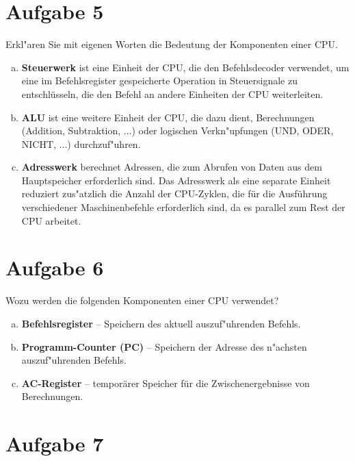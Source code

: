 \documentclass[10pt, a4paper, oneside]{article}
\begin{document}
\section{Aufgabe 5}

Erkl"aren Sie mit eigenen Worten die Bedeutung der Komponenten einer CPU.

\begin{enumerate}[(a)]
    \item \textbf{Steuerwerk} ist eine Einheit der CPU, die den Befehlsdecoder verwendet,
        um eine im Befehlsregister gespeicherte Operation in
        Steuersignale zu entschlüsseln, die den Befehl an andere Einheiten der
        CPU weiterleiten.

    \item \textbf{ALU} ist eine weitere Einheit der CPU, die dazu dient, Berechnungen
        (Addition, Subtraktion, ...) oder logischen Verkn"upfungen (UND, ODER,
        NICHT, ...) durchzuf"uhren.

    \item \textbf{Adresswerk} berechnet Adressen, die zum Abrufen von Daten aus dem
        Hauptspeicher erforderlich sind. Das Adresswerk als eine separate
        Einheit reduziert zus"atzlich die Anzahl der CPU-Zyklen, die für die
        Ausführung verschiedener Maschinenbefehle erforderlich sind, da es
        parallel zum Rest der CPU arbeitet.
\end{enumerate}

\section{Aufgabe 6}

Wozu werden die folgenden Komponenten einer CPU verwendet?

\begin{enumerate}[(a)]
    \item \textbf{Befehlsregister} -- Speichern des aktuell auszuf"uhrenden
            Befehls.
    \item \textbf{Programm-Counter (PC)} -- Speichern der Adresse des n"achsten
        auszuf"uhrenden Befehls.
    \item \textbf{AC-Register} -- temporärer Speicher für die Zwischenergebnisse
        von Berechnungen.
\end{enumerate}

\section{Aufgabe 7}
\end{document}
